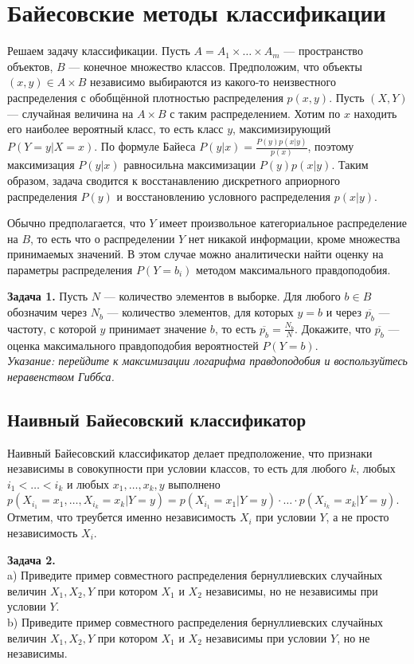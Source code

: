 \section*{Байесовские методы классификации}
Решаем задачу классификации. Пусть $A = A_1 \times \ldots \times A_m$ --- пространство объектов, $B$ --- конечное множество классов. Предположим, что объекты $(x, y) \in A \times B$ независимо выбираются из какого-то неизвестного распределения с обобщённой плотностью распределения $p(x, y)$. Пусть $(X, Y)$ --- случайная величина на $A \times B$ с таким распределением. Хотим по $x$ находить его наиболее вероятный класс, то есть класс $y$, максимизирующий $P(Y=y|X=x)$. По формуле Байеса $P(y|x)=\frac{P(y)p(x|y)}{p(x)}$, поэтому максимизация $P(y|x)$ равносильна максимизации $P(y)p(x|y)$. Таким образом, задача сводится к восстанавлению дискретного априорного распределения $P(y)$ и восстановлению условного распределения $p(x|y)$.

Обычно предполагается, что $Y$ имеет произвольное категориальное распределение на $B$, то есть что о распределении $Y$ нет никакой информации, кроме множества принимаемых значений. В этом случае можно аналитически найти оценку на параметры распределения $P(Y=b_i)$ методом максимального правдоподобия.

\textbf{Задача 1.} Пусть $N$ --- количество элементов в выборке. Для любого $b \in B$ обозначим через $N_b$ --- количество элементов, для которых $y=b$ и через $\overline{p_b}$ --- частоту, с которой $y$ принимает значение $b$, то есть $\overline{p_b} = \frac{N_b}{N}$. Докажите, что $\overline{p_b}$ --- оценка максимального правдоподобия вероятностей $P(Y=b)$. \\
\textit{Указание: перейдите к максимизации логарифма правдоподобия и воспользуйтесь неравенством Гиббса.}


\subsection*{Наивный Байесовский классификатор}

Наивный Байесовский классификатор делает предположение, что признаки независимы в совокупности при условии классов, то есть для любого $k$, любых $i_1 < \ldots < i_k$ и любых $x_1, \ldots, x_k, y$ выполнено $p(X_{i_1}=x_1, \ldots, X_{i_k} = x_k|Y=y)=p(X_{i_1}=x_1|Y=y)\cdot\ldots\cdot p(X_{i_k}=x_k|Y=y)$. Отметим, что треубется именно независимость $X_i$ при условии $Y$, а не просто независимость $X_i$.

\textbf{Задача 2.} \\
a) Приведите пример совместного распределения бернуллиевских случайных величин $X_1, X_2, Y$ при котором $X_1$ и $X_2$ независимы, но не независимы при условии $Y$. \\
b) Приведите пример совместного распределения бернуллиевских случайных величин $X_1, X_2, Y$ при котором $X_1$ и $X_2$ независимы при условии $Y$, но не независимы.

